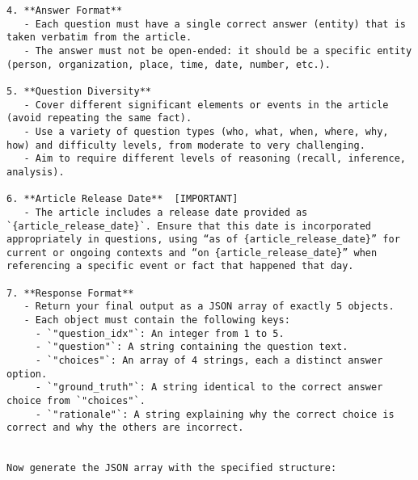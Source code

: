 \documentclass[11pt]{article}
\begin{document}
\begin{lstlisting}[basicstyle=\ttfamily\small,breaklines=true]
4. **Answer Format**  
   - Each question must have a single correct answer (entity) that is taken verbatim from the article.  
   - The answer must not be open-ended: it should be a specific entity (person, organization, place, time, date, number, etc.).  

5. **Question Diversity**  
   - Cover different significant elements or events in the article (avoid repeating the same fact).  
   - Use a variety of question types (who, what, when, where, why, how) and difficulty levels, from moderate to very challenging.  
   - Aim to require different levels of reasoning (recall, inference, analysis).  

6. **Article Release Date**  [IMPORTANT]
   - The article includes a release date provided as `{article_release_date}`. Ensure that this date is incorporated appropriately in questions, using “as of {article_release_date}” for current or ongoing contexts and “on {article_release_date}” when referencing a specific event or fact that happened that day.

7. **Response Format**  
   - Return your final output as a JSON array of exactly 5 objects.  
   - Each object must contain the following keys:
     - `"question_idx"`: An integer from 1 to 5.
     - `"question"`: A string containing the question text.
     - `"choices"`: An array of 4 strings, each a distinct answer option.
     - `"ground_truth"`: A string identical to the correct answer choice from `"choices"`.
     - `"rationale"`: A string explaining why the correct choice is correct and why the others are incorrect.  


Now generate the JSON array with the specified structure:
\end{lstlisting}








\end{document}
